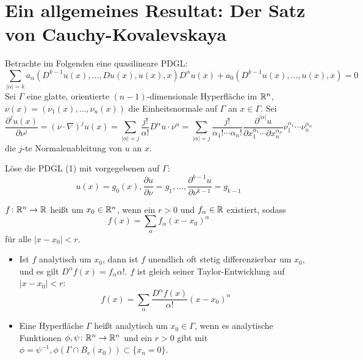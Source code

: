 \section{Ein allgemeines Resultat: Der Satz von Cauchy-Kovalevskaya}
\label{sec:para2}

Betrachte im Folgenden eine quasilineare PDGL:
\begin{equation} \sum\limits_{|\alpha|=k} a_{\alpha}(D^{k-1} u(x), \dots , Du(x),u(x),x) D^\alpha u(x) + a_0(D^{k-1} u(x),\dots,u(x),x) = 0 \end{equation}
Sei $\Gamma$ eine glatte, orientierte $(n-1)$-dimensionale Hyperfläche im $\mathbb{R}^n$, $\nu(x) = (\nu_1(x), \dots, \nu_n(x))$ die Einheitsnormale auf $\Gamma$ an $x \in \Gamma$. Sei 
\[\frac{\partial^j u(x)}{\partial \nu^j} = (\nu \cdot \nabla)^j u(x) = \sum\limits_{|\alpha|=j} \frac{j!}{\alpha!} D^\alpha u \cdot \nu^\alpha = \sum\limits_{|\alpha|=j} \frac{j!}{\alpha_1!\cdots\alpha_n!} \frac{\partial^{|\alpha|}u}{\partial x_1^{\alpha_1} \cdots \partial x_n^{\alpha_n}} \nu_1^{\alpha_1} \cdots \nu_n^{\alpha_n}\] die $j$-te Normalenableitung von $u$ an $x$.

\begin{defn} \label{def_cauchy_problem}
	Löse die PDGL (1) mit vorgegebenen  auf $\Gamma$:  
	\begin{equation}
		u(x) = g_0(x), \frac{\partial u}{\partial \nu} = g_1, \dots, \frac{\partial^{k-1} u}{\partial \nu^{k-1}} = g_{k-1} \end{equation}
\end{defn}

\begin{defn} \label{def_analytische_fkt}
	$f\colon \mathbb{R}^n \rightarrow \mathbb{R}$ heißt  um $x_0 \in \mathbb{R}^n$, wenn ein $r > 0$ und $f_\alpha \in \mathbb{R}$ existiert, sodass
	\[ f(x) = \sum_{\alpha} f_\alpha (x-x_0)^\alpha \]
	für alle $|x-x_0| < r$.
\end{defn}
	
\begin{bem}
	\begin{itemize}
		\item Ist $f$ analytisch um $x_0$, dann ist $f$ unendlich oft stetig differenzierbar um $x_0$, und es gilt $D^\alpha f(x) = f_\alpha \alpha!$. $f$ ist gleich seiner Taylor-Entwicklung auf $|x-x_0| < r$:
		\[ f(x) = \sum_{\alpha} \frac{D^\alpha f(x)}{\alpha!} (x-x_0)^\alpha \]
		\item Eine Hyperfläche $\Gamma$ heißt analytisch um $x_0 \in \Gamma$, wenn es analytische Funktionen $\phi, \psi\colon \mathbb{R}^n \rightarrow \mathbb{R}^n$ und ein $r > 0$ gibt mit $\phi = \psi^{-1}, \phi(\Gamma \cap B_r(x_0)) \subset \{x_n = 0\}$.
	\end{itemize}
\end{bem}
	

